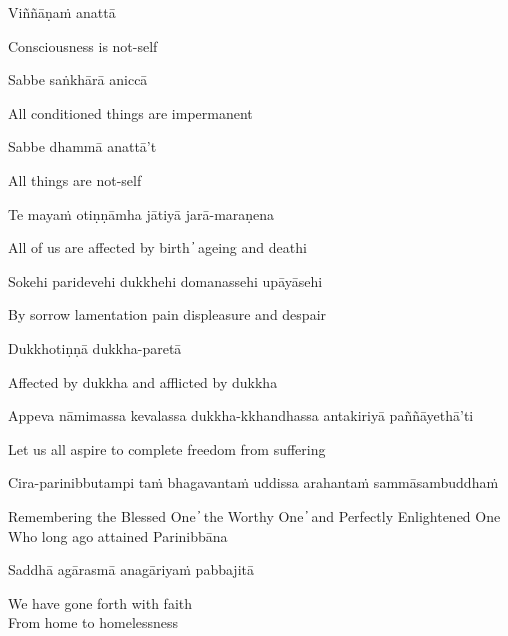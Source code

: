 Viññāṇaṁ anattā

\begin{cprenglish}
  Consciousness is not-self
\end{cprenglish}

Sabbe saṅkhārā aniccā

\begin{cprenglish}
  All conditioned things are impermanent
\end{cprenglish}

Sabbe dhammā anattā't

\begin{cprenglish}
  All things are not-self
\end{cprenglish}

Te mayaṁ otiṇṇāmha jātiyā jarā-maraṇena

\begin{cprenglish}
  All of us are affected by birth  ̓  ageing and deathi
\end{cprenglish}

Sokehi paridevehi dukkhehi domanassehi upāyāsehi

\begin{cprenglish}
  By sorrow lamentation pain displeasure and despair
\end{cprenglish}

Dukkhotiṇṇā dukkha-paretā

\begin{cprenglish}
  Affected by dukkha and afflicted by dukkha
\end{cprenglish}

Appeva nāmimassa kevalassa dukkha-kkhandhassa antakiriyā paññāyethā'ti

\begin{cprenglish}
  Let us all aspire to complete freedom from suffering
\end{cprenglish}

Cira-parinibbutampi taṁ bhagavantaṁ uddissa arahantaṁ sammāsambuddhaṁ

\begin{cprenglish}
  Remembering the Blessed One  ̓  the Worthy One  ̓  and Perfectly Enlightened One\\
  Who long ago attained Parinibbāna
\end{cprenglish}

Saddhā agārasmā anagāriyaṁ pabbajitā

\begin{cprenglish}
  We have gone forth with faith\\
  From home to homelessness
\end{cprenglish}

